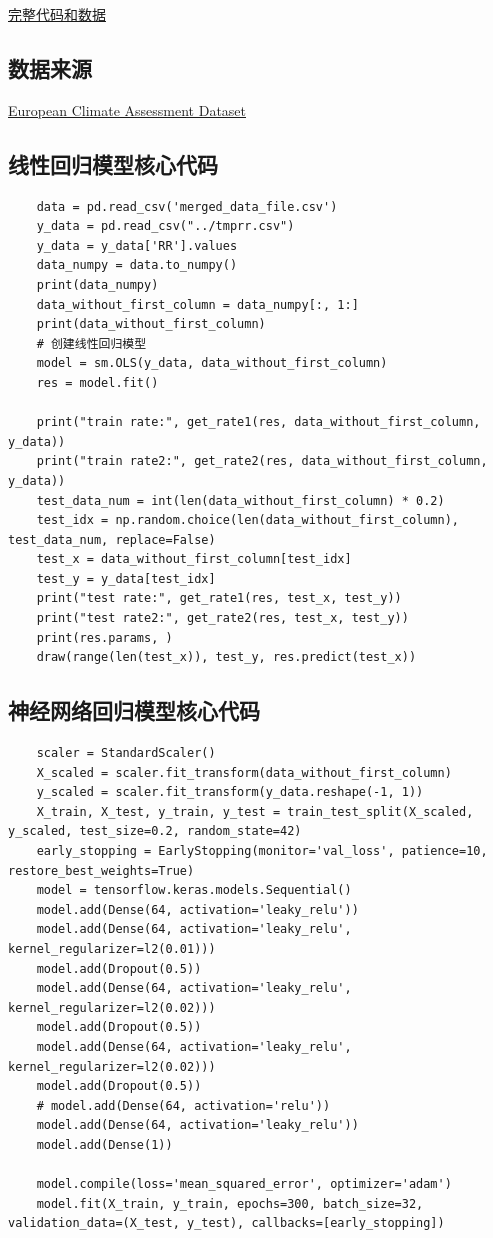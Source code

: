 \documentclass[UTF8, a4paper]{ctexart}
\begin{document}
\href{https://github.com/limuy2022/math_model}{完整代码和数据}

\subsection{数据来源}\label{data}

\href{https://www.ecad.eu/}{European Climate Assessment  Dataset}

\subsection{线性回归模型核心代码}\label{liner_program}

\begin{lstlisting}
	data = pd.read_csv('merged_data_file.csv')
	y_data = pd.read_csv("../tmprr.csv")
	y_data = y_data['RR'].values
	data_numpy = data.to_numpy()
	print(data_numpy)
	data_without_first_column = data_numpy[:, 1:]
	print(data_without_first_column)
	# 创建线性回归模型
	model = sm.OLS(y_data, data_without_first_column)
	res = model.fit()
	
	print("train rate:", get_rate1(res, data_without_first_column, y_data))
	print("train rate2:", get_rate2(res, data_without_first_column, y_data))
	test_data_num = int(len(data_without_first_column) * 0.2)
	test_idx = np.random.choice(len(data_without_first_column), test_data_num, replace=False)
	test_x = data_without_first_column[test_idx]
	test_y = y_data[test_idx]
	print("test rate:", get_rate1(res, test_x, test_y))
	print("test rate2:", get_rate2(res, test_x, test_y))
	print(res.params, )
	draw(range(len(test_x)), test_y, res.predict(test_x))
\end{lstlisting}

\subsection{神经网络回归模型核心代码}\label{net_program}
\begin{lstlisting}
	scaler = StandardScaler()
	X_scaled = scaler.fit_transform(data_without_first_column)
	y_scaled = scaler.fit_transform(y_data.reshape(-1, 1))
	X_train, X_test, y_train, y_test = train_test_split(X_scaled, y_scaled, test_size=0.2, random_state=42)
	early_stopping = EarlyStopping(monitor='val_loss', patience=10, restore_best_weights=True)
	model = tensorflow.keras.models.Sequential()
	model.add(Dense(64, activation='leaky_relu'))
	model.add(Dense(64, activation='leaky_relu', kernel_regularizer=l2(0.01)))
	model.add(Dropout(0.5))
	model.add(Dense(64, activation='leaky_relu', kernel_regularizer=l2(0.02)))
	model.add(Dropout(0.5))
	model.add(Dense(64, activation='leaky_relu', kernel_regularizer=l2(0.02)))
	model.add(Dropout(0.5))
	# model.add(Dense(64, activation='relu'))
	model.add(Dense(64, activation='leaky_relu'))
	model.add(Dense(1))
	
	model.compile(loss='mean_squared_error', optimizer='adam')
	model.fit(X_train, y_train, epochs=300, batch_size=32, validation_data=(X_test, y_test), callbacks=[early_stopping])
\end{lstlisting}
\end{document}
